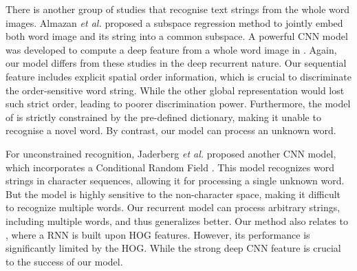 \documentclass[letterpaper]{article}
\begin{document}

There is another group of studies that recognise text strings from the whole word images. Almazan \emph{et al.} \cite{Almazan2014} proposed a subspace regression method to jointly embed both word image and its string into a common subspace.
 A powerful CNN model was developed to compute a deep feature from a whole word image in \cite{Jaderberg2015b}. Again, our model differs from these studies in the deep recurrent nature. Our  sequential feature includes explicit spatial order information, which is crucial to discriminate the order-sensitive word string. While the other global representation would lost such strict order, leading to poorer discrimination power. Furthermore, the model of \cite{Jaderberg2015b} is strictly constrained by the pre-defined dictionary, making it unable to recognise a novel word. By contrast, our model can process an unknown word. %

For unconstrained recognition, Jaderberg \emph{et al.} proposed another CNN model, which incorporates a Conditional Random Field \cite{Jaderberg2015a}. This model recognizes word strings in character sequences, allowing it for processing a single unknown word. But the model is highly sensitive to the non-character space, making it difficult to recognize multiple words.
 Our recurrent model can process arbitrary strings, including multiple words, and thus generalizes better.
%
 Our method also relates to \cite{Su2014}, where a RNN is built upon HOG features. However, its performance is significantly limited by the HOG.
  While the strong deep CNN feature is crucial to the success of our model.
\end{document}
